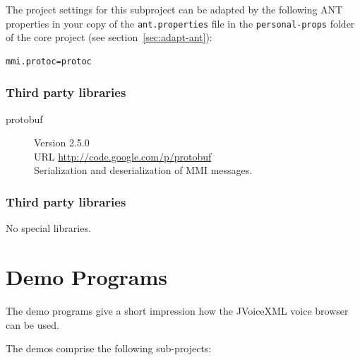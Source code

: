 \documentclass[11pt,a4paper]{article}
\begin{document}
The project settings for this subproject can be adapted by the following ANT
properties in your copy of the \texttt{ant.properties} file in the
\texttt{personal-props} folder of the core project (see 
section~\ref{sec:adapt-ant}):
\begin{lstlisting}
mmi.protoc=protoc
\end{lstlisting}

\subsubsection{Third party libraries}

\begin{description}
\item[protobuf] Version 2.5.0 \\
URL \url{http://code.google.com/p/protobuf} \\
Serialization and deserialization of MMI messages.
\end{description}


\subsubsection{Third party libraries}

No special libraries.

\section{Demo Programs}

The demo programs give a short impression how the JVoiceXML voice browser can
be used.

The demos comprise the following sub-projects:
\end{document}
